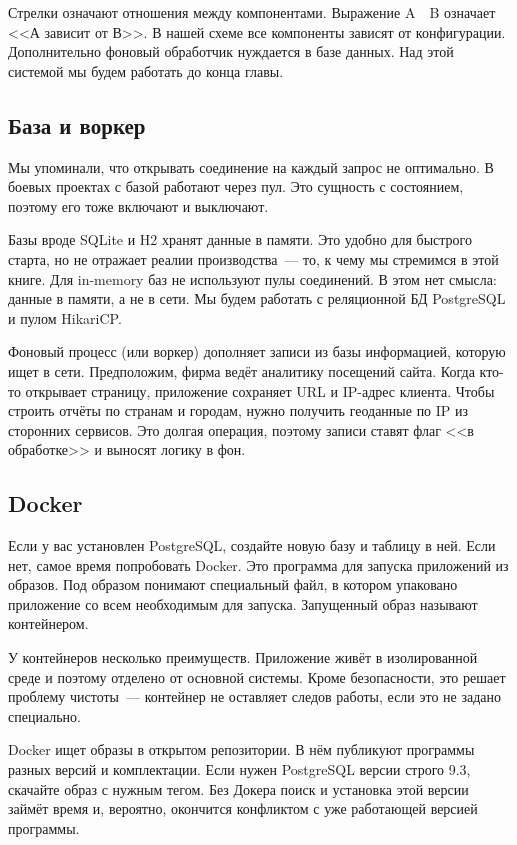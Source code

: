 Стрелки означают отношения между компонентами. Выражение A~\arr~B означает
<<А зависит от В>>. В нашей схеме все компоненты зависят от конфигурации.
Дополнительно фоновый обработчик нуждается в базе данных. Над этой
системой мы будем работать до конца главы.

\subsection{База и воркер}

Мы упоминали, что открывать соединение на каждый запрос не оптимально. В боевых
проектах с базой работают через пул. Это сущность с состоянием, поэтому его тоже
включают и выключают.


Базы вроде SQLite и H2 хранят данные в памяти. Это удобно для быстрого старта,
но не отражает реалии производства~--- то, к чему мы стремимся в этой книге. Для
in-memory баз не используют пулы соединений. В этом нет смысла: данные в памяти,
а не в сети. Мы будем работать с реляционной БД PostgreSQL и пулом HikariCP.

Фоновый процесс (или воркер) дополняет записи из базы информацией, которую ищет
в сети. Предположим, фирма ведёт аналитику посещений сайта. Когда кто-то
открывает страницу, приложение сохраняет URL и IP-адрес клиента. Чтобы строить
отчёты по странам и городам, нужно получить геоданные по IP из сторонних
сервисов. Это долгая операция, поэтому записи ставят флаг <<в обработке>> и
выносят логику в фон.

\subsection{Docker}


\label{docker-db}

Если у вас установлен PostgreSQL, создайте новую базу и таблицу в ней. Если нет,
самое время попробовать Docker. Это программа для запуска приложений из
образов. Под образом понимают специальный файл, в котором упаковано приложение
со всем необходимым для запуска. Запущенный образ называют контейнером.

У контейнеров несколько преимуществ. Приложение живёт в изолированной среде и
поэтому отделено от основной системы. Кроме безопасности, это решает проблему
чистоты~--- контейнер не оставляет следов работы, если это не задано специально.

Docker ищет образы в открытом репозитории. В нём публикуют программы разных
версий и комплектации. Если нужен PostgreSQL версии строго 9.3, скачайте образ с
нужным тегом. Без Докера поиск и установка этой версии займёт время и, вероятно,
окончится конфликтом с уже работающей версией программы.

